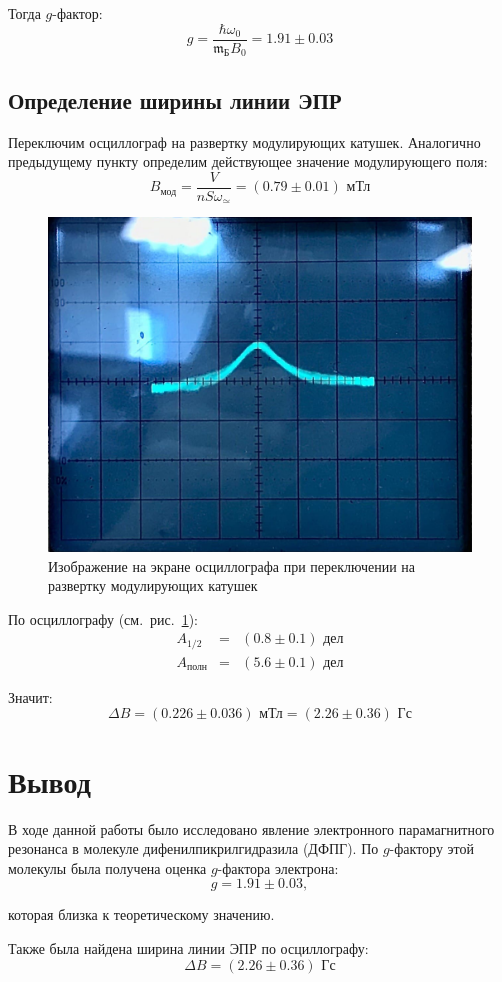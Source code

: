 \documentclass[reprint, nofootinbib, nobalancelastpage, 10pt]{revtex4-2}
\begin{document}
Тогда $g$-фактор:
\[ g = \dfrac{\hbar \omega_0}{\mathfrak{m}_{\text{Б}} B_0} = 1.91 \pm 0.03 \]

\subsection{Определение ширины линии ЭПР}

Переключим осциллограф на развертку модулирующих катушек. Аналогично предыдущему пункту
определим действующее значение модулирующего поля:
\[ B_{\text{мод}} = \dfrac{V}{n S \omega_{\simeq}} = (0.79 \pm 0.01) \text{ мТл} \]

\begin{figure}[h!]
	\includegraphics[width=0.8\linewidth]{4.png}
	\caption{Изображение на экране осциллографа при переключении на развертку
				модулирующих катушек}
	\label{img:4}
\end{figure}

По осциллографу (см.~рис.~\ref{img:4}):
\begin{eqnarray*}
	A_{1/2} &=& (0.8 \pm 0.1) \text{ дел} \\
	A_{\text{полн}} &=& (5.6 \pm 0.1) \text{ дел}
\end{eqnarray*}

Значит:
\[\Delta B = (0.226 \pm 0.036) \text{ мТл} = (2.26 \pm 0.36) \text{ Гс}\]

\section*{Вывод}

В ходе данной работы было исследовано явление электронного парамагнитного резонанса в
молекуле дифенилпикрилгидразила (ДФПГ). По $g$-фактору этой молекулы была получена оценка
$g$-фактора электрона:
\[ g = 1.91 \pm 0.03, \]

которая близка к теоретическому значению.

Также была найдена ширина линии ЭПР по осциллографу:
\[ \Delta B = (2.26 \pm 0.36) \text{ Гс} \]
\end{document}
